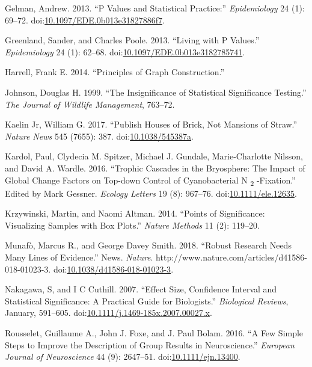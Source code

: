 \documentclass[fleqn,10pt,lineno]{wlpeerj} %
\theoremstyle{definition}
\theoremstyle{definition}
\theoremstyle{definition}
\theoremstyle{remark}
\begin{document}
\hypertarget{ref-Gelman_Values_2013}{}
Gelman, Andrew. 2013. ``P Values and Statistical Practice:''
\emph{Epidemiology} 24 (1): 69--72.
doi:\href{https://doi.org/10.1097/EDE.0b013e31827886f7}{10.1097/EDE.0b013e31827886f7}.

\hypertarget{ref-Greenland_Living_2013}{}
Greenland, Sander, and Charles Poole. 2013. ``Living with P Values.''
\emph{Epidemiology} 24 (1): 62--68.
doi:\href{https://doi.org/10.1097/EDE.0b013e3182785741}{10.1097/EDE.0b013e3182785741}.

\hypertarget{ref-Harrell_Principles_2014}{}
Harrell, Frank E. 2014. ``Principles of Graph Construction.''

\hypertarget{ref-Johnson_insignificance_1999}{}
Johnson, Douglas H. 1999. ``The Insignificance of Statistical
Significance Testing.'' \emph{The Journal of Wildlife Management},
763--72.

\hypertarget{ref-KaelinJr_Publish_2017}{}
Kaelin Jr, William G. 2017. ``Publish Houses of Brick, Not Mansions of
Straw.'' \emph{Nature News} 545 (7655): 387.
doi:\href{https://doi.org/10.1038/545387a}{10.1038/545387a}.

\hypertarget{ref-Kardol_Trophic_2016}{}
Kardol, Paul, Clydecia M. Spitzer, Michael J. Gundale, Marie-Charlotte
Nilsson, and David A. Wardle. 2016. ``Trophic Cascades in the
Bryosphere: The Impact of Global Change Factors on Top-down Control of
Cyanobacterial N \textsubscript{2} -Fixation.'' Edited by Mark Gessner.
\emph{Ecology Letters} 19 (8): 967--76.
doi:\href{https://doi.org/10.1111/ele.12635}{10.1111/ele.12635}.

\hypertarget{ref-Krzywinski_Points_2014}{}
Krzywinski, Martin, and Naomi Altman. 2014. ``Points of Significance:
Visualizing Samples with Box Plots.'' \emph{Nature Methods} 11 (2):
119--20.

\hypertarget{ref-Munafo_Robust_2018}{}
Munafò, Marcus R., and George Davey Smith. 2018. ``Robust Research Needs
Many Lines of Evidence.'' News. \emph{Nature}.
http://www.nature.com/articles/d41586-018-01023-3.
doi:\href{https://doi.org/10.1038/d41586-018-01023-3}{10.1038/d41586-018-01023-3}.

\hypertarget{ref-Nakagawa_Effect_2007}{}
Nakagawa, S, and I C Cuthill. 2007. ``Effect Size, Confidence Interval
and Statistical Significance: A Practical Guide for Biologists.''
\emph{Biological Reviews}, January, 591--605.
doi:\href{https://doi.org/10.1111/j.1469-185x.2007.00027.x}{10.1111/j.1469-185x.2007.00027.x}.

\hypertarget{ref-Rousselet_few_2016}{}
Rousselet, Guillaume A., John J. Foxe, and J. Paul Bolam. 2016. ``A Few
Simple Steps to Improve the Description of Group Results in
Neuroscience.'' \emph{European Journal of Neuroscience} 44 (9):
2647--51.
doi:\href{https://doi.org/10.1111/ejn.13400}{10.1111/ejn.13400}.
\end{document}

